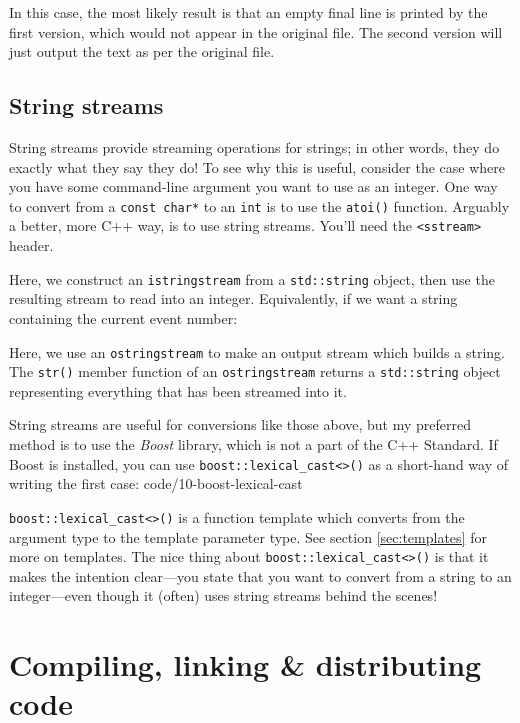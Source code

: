 \documentclass[a4paper]{scrartcl}
\begin{document}




In this case, the most likely result is that an empty final line is printed by the first version, which would not appear in the original file. The second version will just output the text as per the original file.

\subsection{String streams}
String streams provide streaming operations for strings; in other words, they do exactly what they say they do! To see why this is useful, consider the case where you have some command-line argument you want to use as an integer. One way to convert from a \verb|const char*| to an \verb|int| is to use the \verb|atoi()| function. Arguably a better, more C++ way, is to use string streams. You'll need the \verb|<sstream>| header.


Here, we construct an \verb|istringstream| from a \verb|std::string| object, then use the resulting stream to read into an integer. Equivalently, if we want a string containing the current event number:



Here, we use an \verb|ostringstream| to make an output stream which builds a string. The \verb|str()| member function of an \verb|ostringstream| returns a \verb|std::string| object representing everything that has been streamed into it.

String streams are useful for conversions like those above, but my preferred method is to use the \emph{Boost} library, which is not a part of the C++ Standard. If Boost is installed, you can use \verb|boost::lexical_cast<>()| as a short-hand way of writing the first case:
 {code/10-boost-lexical-cast}

\verb|boost::lexical_cast<>()| is a function template which converts from the argument type to the template parameter type. See section \ref{sec:templates} for more on templates. The nice thing about \verb|boost::lexical_cast<>()| is that it makes the intention clear---you state that you want to convert from a string to an integer---even though it (often) uses string streams behind the scenes!

\section{Compiling, linking \& distributing code}\label{sec:compiling}
\end{document}
